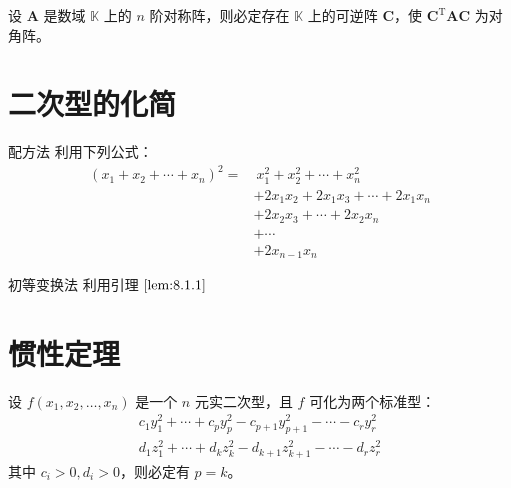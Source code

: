 \begin{theorem}
    设 $\bm{A}$ 是数域 $\mathbb{K}$ 上的 $n$ 阶对称阵，则必定存在 $\mathbb{K}$ 上的可逆阵 $\bm{C}$，使 $\bm{C}^{\mathrm{T}}\bm{AC}$ 为对角阵。
\end{theorem}



\section{二次型的化简}

\begin{proposition}{配方法}
    利用下列公式：
    \begin{align*}
        (x_1 + x_2 + \cdots + x_n)^2 = & \ x_{1}^{2} + x_{2}^{2} + \cdots + x_{n}^{2}       \\
                                       & + 2x_{1}x_{2} + 2x_{1}x_{3} + \cdots + 2x_{1}x_{n} \\
                                       & + 2x_{2}x_{3} + \cdots + 2x_{2}x_{n}               \\
                                       & + \cdots                                           \\
                                       & + 2x_{n - 1}x_{n}
    \end{align*}
\end{proposition}

\begin{proposition}{初等变换法}
    利用引理 $\ref{lem:8.1.1}$
\end{proposition}






\section{惯性定理}

\begin{definition}
  设 $f(x_1, x_2, \ldots, x_n)$ 是一个 $n$ 元实二次型，且 $f$ 可化为两个标准型：
  \begin{align*}
    c_{1}y_{1}^{2} + \cdots + c_{p}y_{p}^{2} - c_{p + 1}y_{p + 1}^{2} - \cdots - c_{r}y_{r}^{2} \\
    d_{1}z_{1}^{2} + \cdots + d_{k}z_{k}^{2} - d_{k + 1}z_{k + 1}^{2} - \cdots - d_{r}z_{r}^{2} 
  \end{align*}
  其中 $c_{i} > 0, d_{i} > 0$，则必定有 $p = k$。
\end{definition}

